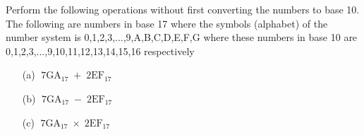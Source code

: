Perform the following operations without first converting the numbers to base
10.
The following are numbers in base 17 where the
symbols (alphabet) of the number system is
0,1,2,3,...,9,A,B,C,D,E,F,G
where these numbers in base 10 are
0,1,2,3,...,9,10,11,12,13,14,15,16 respectively

\begin{enumerate}[nosep]
\item[(a)] $\operatorname{7GA}_{17} + \operatorname{2EF}_{17}$	
\item[(b)] $\operatorname{7GA}_{17} - \operatorname{2EF}_{17}$	
\item[(c)] $\operatorname{7GA}_{17} \times \operatorname{2EF}_{17}$
\end{enumerate}
